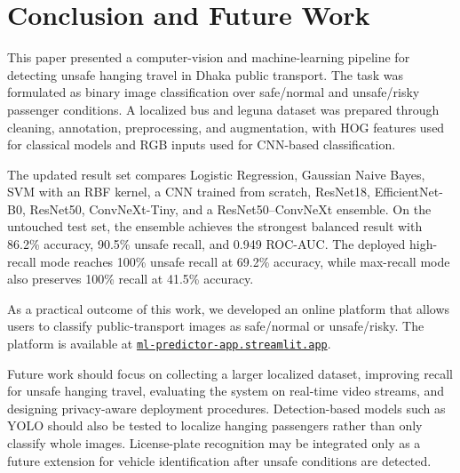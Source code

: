 \documentclass[conference]{IEEEtran}
\begin{document}
\section{Conclusion and Future Work}
This paper presented a computer-vision and machine-learning pipeline for detecting unsafe hanging travel in Dhaka public transport. The task was formulated as binary image classification over safe/normal and unsafe/risky passenger conditions. A localized bus and leguna dataset was prepared through cleaning, annotation, preprocessing, and augmentation, with HOG features used for classical models and RGB inputs used for CNN-based classification.

The updated result set compares Logistic Regression, Gaussian Naive Bayes, SVM with an RBF kernel, a CNN trained from scratch, ResNet18, EfficientNet-B0, ResNet50, ConvNeXt-Tiny, and a ResNet50--ConvNeXt ensemble. On the untouched test set, the ensemble achieves the strongest balanced result with 86.2\% accuracy, 90.5\% unsafe recall, and 0.949 ROC-AUC. The deployed high-recall mode reaches 100\% unsafe recall at 69.2\% accuracy, while max-recall mode also preserves 100\% recall at 41.5\% accuracy.

As a practical outcome of this work, we developed an online platform that allows users to classify public-transport images as safe/normal or unsafe/risky. The platform is available at \href{https://ml-predictor-app.streamlit.app/}{\texttt{ml-predictor-app.streamlit.app}}.

Future work should focus on collecting a larger localized dataset, improving recall for unsafe hanging travel, evaluating the system on real-time video streams, and designing privacy-aware deployment procedures. Detection-based models such as YOLO \cite{redmon2016yolo} should also be tested to localize hanging passengers rather than only classify whole images. License-plate recognition may be integrated only as a future extension for vehicle identification after unsafe conditions are detected.
\end{document}
